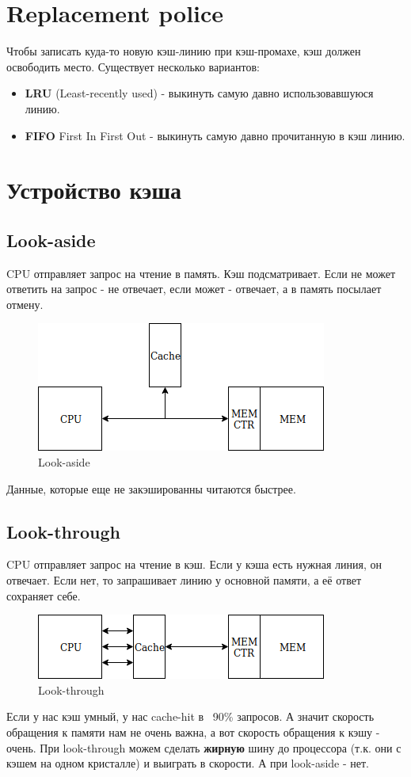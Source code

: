 \documentclass[12pt, a4paper]{article}
\begin{document}
\section{Replacement police}
Чтобы записать куда-то новую кэш-линию при кэш-промахе, кэш должен освободить место. Существует несколько вариантов:\\
\begin{itemize}
    \item \textbf{LRU} (Least-recently used) - выкинуть самую давно использовавшуюся линию.
    \item \textbf{FIFO} {First In First Out} - выкинуть самую давно прочитанную в кэш линию.
\end{itemize}
\section{Устройство кэша}
\subsection{Look-aside}
CPU отправляет запрос на чтение в память. Кэш подсматривает. Если не может ответить на запрос - не отвечает, если может - отвечает, а в память посылает отмену.\\
\begin{figure}[h]
    \centering
    \includegraphics[scale=0.5]{images/LookAside.png}
    \caption{Look-aside}
    \label{fig:LookAside}
\end{figure}
Данные, которые еще не закэшированны читаются быстрее. 
\subsection{Look-through}
CPU отправляет запрос на чтение в кэш. Если у кэша есть нужная линия, он отвечает. Если нет, то запрашивает линию у основной памяти, а её ответ сохраняет себе.
\begin{figure}[h]
    \centering
    \includegraphics[scale=0.5]{images/LookThrough.png}
    \caption{Look-through}
    \label{fig:LookThrough}
\end{figure}
Если у нас кэш умный, у нас cache-hit в ~90\% запросов. А значит скорость обращения к памяти нам не очень важна, а вот скорость обращения к кэшу - очень. При look-through можем сделать \textbf{жирную} шину до процессора (т.к. они с кэшем на одном кристалле) и выиграть в скорости. А при look-aside - нет.
\end{document}
